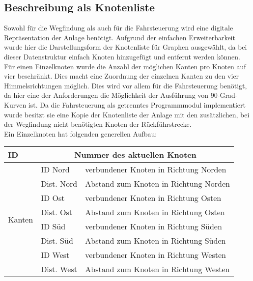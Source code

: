 		\subsection{Beschreibung als Knotenliste}
			Sowohl für die Wegfindung als auch für die Fahrsteuerung wird eine digitale Repräsentation der Anlage benötigt. Aufgrund der einfachen Erweiterbarkeit wurde hier die Darstellungsform der Knotenliste für Graphen ausgewählt, da bei dieser Datenstruktur einfach Knoten hinzugefügt und entfernt werden können. Für einen Einzelknoten wurde die Anzahl der möglichen Kanten pro Knoten auf vier beschränkt. Dies macht eine Zuordnung der einzelnen Kanten zu den vier Himmelsrichtungen möglich. Dies wird vor allem für die Fahrsteuerung benötigt, da hier eine der Anforderungen die Möglichkeit der Ausführung von 90-Grad-Kurven ist. Da die Fahrsteuerung als getrenntes Programmmodul implementiert wurde besitzt sie eine Kopie der Knotenliste der Anlage mit den zusätzlichen, bei der Wegfindung nicht benötigten Knoten der Rückführstrecke.\\
			Ein Einzelknoten hat folgenden generellen Aufbau:\\
			
			\begin{longtable}{| l | l | l |}
				
				\hline
				\textbf{ID} &
				\multicolumn{2}{c|}{Nummer des aktuellen Knoten} \\
				\hline
				\multirow{8}{*}{Kanten}
					& ID Nord & verbundener Knoten in Richtung Norden \\ \cline{2-3}
					& Dist. Nord & Abstand zum Knoten in Richtung Norden\\ \cline{2-3}
					& ID Ost & verbundener Knoten in Richtung Osten \\ \cline{2-3}
					& Dist. Ost & Abstand zum Knoten in Richtung Osten\\ \cline{2-3}
					& ID Süd & verbundener Knoten in Richtung Süden\\ \cline{2-3}
					& Dist. Süd & Abstand zum Knoten in Richtung Süden\\ \cline{2-3}
					& ID West & verbundener Knoten in Richtung Westen\\ \cline{2-3}
					& Dist. West & Abstand zum Knoten in Richtung Westen\\ 
					\hline
	
			\end{longtable}
			
